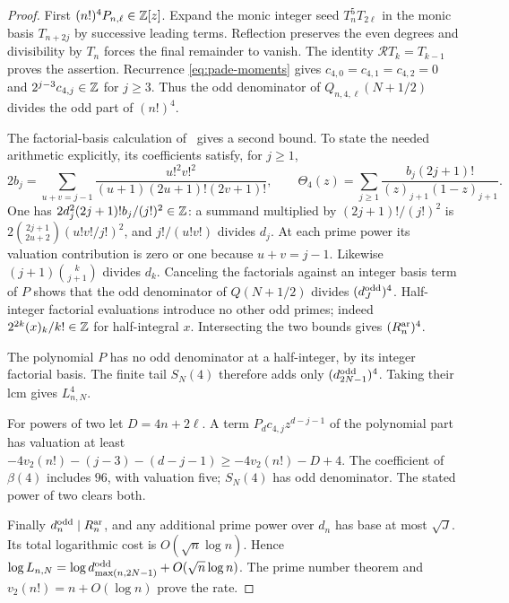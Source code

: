 \begin{proof}
First $(n!)^4P_{n,\ell}\in\mathbb Z[z]$. Expand the monic integer seed
$T_n^5T_{2\ell}$ in the monic basis $T_{n+2j}$ by successive leading
terms. Reflection preserves the even degrees and divisibility by $T_n$
forces the final remainder to vanish. The identity
$\mathcal R T_k=T_{k-1}$ proves the assertion. Recurrence
\eqref{eq:pade-moments} gives
$c_{4,0}=c_{4,1}=c_{4,2}=0$ and $2^{j-3}c_{4,j}\in\mathbb Z$ for $j\ge3$.
Thus the odd denominator of $Q_{n,4,\ell}(N+1/2)$ divides the odd
part of $(n!)^4$.

The factorial-basis calculation of~\cite[Sections 5 and 9]{KP}
gives a second bound. To state the needed arithmetic explicitly, its
coefficients satisfy, for $j\ge1$,
\[
 2b_j=\sum_{u+v=j-1}\frac{u!^2v!^2}{(u+1)(2u+1)!(2v+1)!},
 \qquad
 \Theta_4(z)=\sum_{j\ge1}\frac{b_j(2j+1)!}{(z)_{j+1}(1-z)_{j+1}}.
\]
One has $2d_j^2(2j+1)!b_j/(j!)^2\in\mathbb Z$: a summand multiplied by
$(2j+1)!/(j!)^2$ is
$2\binom{2j+1}{2u+2}(u!v!/j!)^2$, and $j!/(u!v!)$ divides $d_j$.
At each prime power its valuation contribution is zero or one because
$u+v=j-1$. Likewise $(j+1)\binom{k}{j+1}$ divides $d_k$.
Canceling the factorials against an integer basis term of $P$ shows
that the odd denominator of $Q(N+1/2)$ divides $(d_J^{\rm odd})^4$.
Half-integer factorial evaluations introduce no other odd primes;
indeed $2^{2k}(x)_k/k!\in\mathbb Z$ for half-integral $x$.
Intersecting the two bounds gives $(R_n^{\rm ar})^4$.

The polynomial $P$ has no odd denominator at a half-integer, by its
integer factorial basis. The finite tail $S_N(4)$ therefore adds
only $(d_{2N-1}^{\rm odd})^4$. Taking their lcm gives $L_{n,N}^4$.

For powers of two let $D=4n+2\ell$. A term $P_dc_{4,j}z^{d-j-1}$
of the polynomial part has valuation at least
$-4v_2(n!)-(j-3)-(d-j-1)\ge-4v_2(n!)-D+4$.
The coefficient of $\beta(4)$ includes $96$, with valuation five;
$S_N(4)$ has odd denominator. The stated power of two clears both.

Finally $d_n^{\rm odd}\mid R_n^{\rm ar}$, and any additional prime
power over $d_n$ has base at most $\sqrt J$. Its total logarithmic
cost is $O(\sqrt n\log n)$. Hence
$\log L_{n,N}=\log d_{\max(n,2N-1)}^{\rm odd}+O(\sqrt n\log n)$.
The prime number theorem and $v_2(n!)=n+O(\log n)$ prove the rate.
\end{proof}

